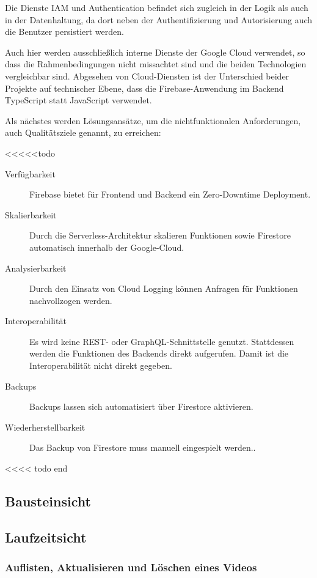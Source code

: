 Die Dienste IAM und Authentication befindet sich zugleich in der Logik als auch in der Datenhaltung, da dort neben der Authentifizierung und Autorisierung auch die Benutzer persistiert werden.

Auch hier werden ausschließlich interne Dienste der Google Cloud verwendet, so dass die Rahmenbedingungen nicht missachtet sind und die beiden Technologien vergleichbar sind. Abgesehen von Cloud-Diensten ist der Unterschied beider Projekte auf technischer Ebene, dass die Firebase-Anwendung im Backend TypeScript statt JavaScript verwendet.

Als nächstes werden Lösungsansätze, um die nichtfunktionalen Anforderungen, auch Qualitätsziele genannt, zu erreichen:

<<<<<todo
\begin{description}
   \item[Verfügbarkeit] Firebase bietet für Frontend und Backend ein Zero-Downtime Deployment.
   \item[Skalierbarkeit] Durch die Serverless-Architektur skalieren Funktionen sowie Firestore automatisch innerhalb der \ac{Google}-Cloud.
   \item[Analysierbarkeit] Durch den Einsatz von Cloud Logging können Anfragen für Funktionen nachvollzogen werden.
   \item[Interoperabilität] Es wird keine REST- oder GraphQL-Schnittstelle genutzt. Stattdessen werden die Funktionen des Backends direkt aufgerufen. Damit ist die Interoperabilität nicht direkt gegeben.
   \item[Backups] Backups lassen sich automatisiert über Firestore aktivieren.
   \item[Wiederherstellbarkeit] Das Backup von Firestore muss manuell eingespielt werden..
\end{description}
<<<< todo end

\subsection{Bausteinsicht}

\subsection{Laufzeitsicht}

\subsubsection{Auflisten, Aktualisieren und Löschen eines Videos}

